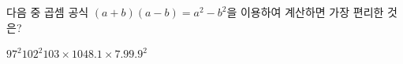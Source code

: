 다음 중 곱셈 공식 $(a+b)(a-b)=a^2-b^2$을 이용하여 계산하면 가장 편리한 것은?
\begin{choices32}{$97^2$}{$102^2$}{$103\times 104$}{$8.1\times 7.9$}{$9.9^2$}\end{choices32}
